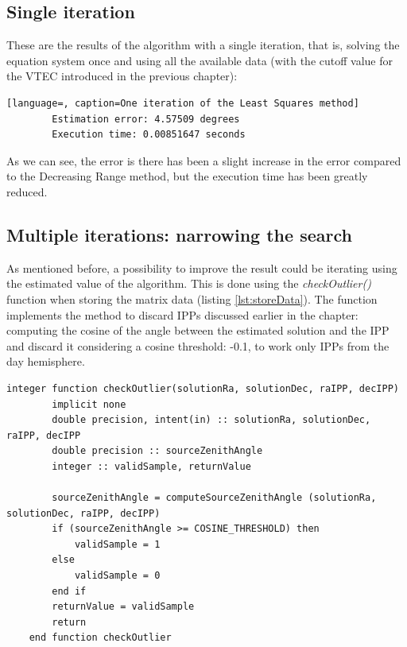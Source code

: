 \subsection{Single iteration}

These are the results of the algorithm with a single iteration, that is, solving the equation system once and using all the available data (with the cutoff value for the VTEC introduced in the previous chapter):

\begin{minipage}{\linewidth}
	\begin{lstlisting}[language=, caption=One iteration of the Least Squares method]
		Estimation error: 4.57509 degrees
		Execution time: 0.00851647 seconds\end{lstlisting}
\end{minipage}

As we can see, the error is there has been a slight increase in the error compared to the Decreasing Range method, but the execution time has been greatly reduced.

\subsection{Multiple iterations: narrowing the search} \label{sssec:covariance}

As mentioned before, a possibility to improve the result could be iterating using the estimated value of the algorithm. This is done using the \textit{checkOutlier()} function when storing the matrix data (listing \ref{lst:storeData}). The function implements the method to discard IPPs discussed earlier in the chapter:  computing the cosine of the angle between the estimated solution and the IPP and discard it considering a cosine threshold: -0.1, to work only IPPs from the day hemisphere.

\begin{minipage}{\linewidth}
	\label{lst:solveSystem}
	\begin{lstlisting}[style=myFortranStyle, caption=Function checkOutlier to discard outliers]
	integer function checkOutlier(solutionRa, solutionDec, raIPP, decIPP)
		implicit none
		double precision, intent(in) :: solutionRa, solutionDec, raIPP, decIPP
		double precision :: sourceZenithAngle
		integer :: validSample, returnValue

		sourceZenithAngle = computeSourceZenithAngle (solutionRa, solutionDec, raIPP, decIPP)
		if (sourceZenithAngle >= COSINE_THRESHOLD) then
			validSample = 1
		else
			validSample = 0
		end if
		returnValue = validSample
		return
	end function checkOutlier\end{lstlisting}
\end{minipage}

